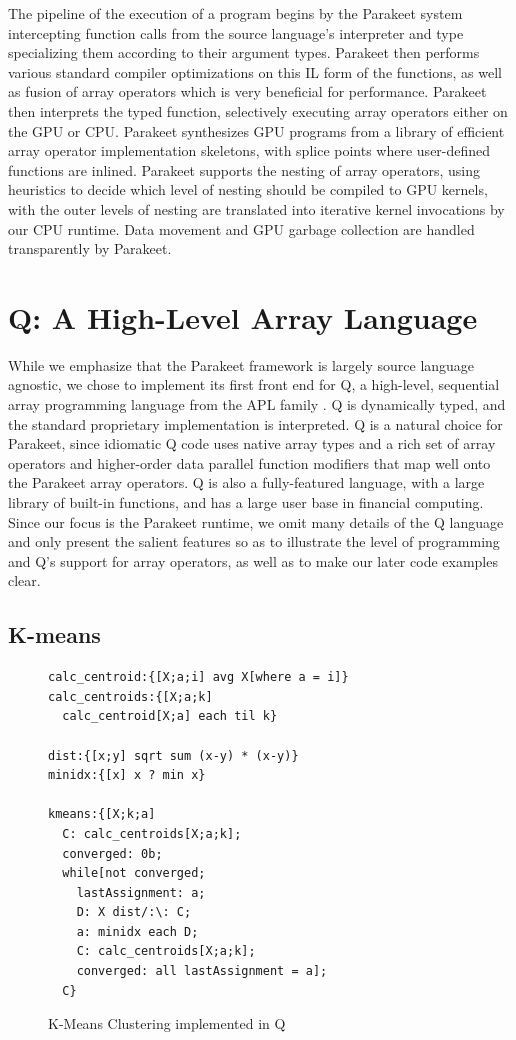 \documentclass[preprint]{sigplanconf}
\begin{document}
The pipeline of the execution of a program begins by the Parakeet system
intercepting function calls from the source language's interpreter and type
specializing them according to their argument types.  Parakeet then performs
various standard compiler optimizations on this IL form of the functions, as
well as fusion of array operators which is very beneficial for performance.
Parakeet then interprets the typed function, selectively executing array
operators either on the GPU or CPU. Parakeet synthesizes GPU
programs from a library of efficient array operator implementation skeletons,
with splice points where user-defined functions are inlined. Parakeet supports
the nesting of array operators, using heuristics to decide which level of
nesting should be compiled to GPU kernels, with the outer levels of nesting are
translated into iterative kernel invocations by our CPU runtime.  Data movement
and GPU garbage collection are handled transparently by Parakeet.



\section{Q: A High-Level Array Language}
\label{Q}

While we emphasize that the Parakeet framework is largely source language
agnostic, we chose to implement its first front end for Q, a high-level,
sequential array programming language from the APL family \cite{Borr08}.
Q is dynamically typed, and the standard proprietary implementation is
interpreted. Q is a natural choice for Parakeet, since idiomatic Q code uses
native array types and a rich set of array operators and higher-order
data parallel function modifiers that map well onto the Parakeet array
operators. Q is also a fully-featured language, with a large library of built-in
functions, and has a large user base in financial computing. Since our
focus is the Parakeet runtime, we omit many details of the Q language and only
present the salient features so as to illustrate the level of programming
and Q's support for array operators, as well as to make our later code examples
clear.

\subsection{K-means}
\begin{figure}[h!]
\begin{lstlisting}[numbers=none]
calc_centroid:{[X;a;i] avg X[where a = i]}
calc_centroids:{[X;a;k] 
  calc_centroid[X;a] each til k}
  
dist:{[x;y] sqrt sum (x-y) * (x-y)}
minidx:{[x] x ? min x}

kmeans:{[X;k;a]
  C: calc_centroids[X;a;k];
  converged: 0b;
  while[not converged;
    lastAssignment: a;
    D: X dist/:\: C;
    a: minidx each D;
    C: calc_centroids[X;a;k];
    converged: all lastAssignment = a];
  C}
\end{lstlisting}
\caption{K-Means Clustering implemented in Q}
\label{QKMeans}
\end{figure}
\end{document}
